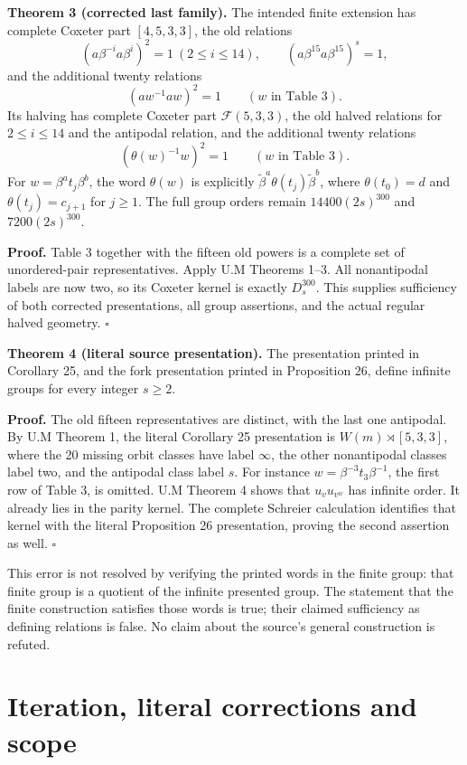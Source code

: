 \textbf{Theorem 3 (corrected last family).} The intended finite extension has complete Coxeter part \([4,5,3,3]\), the old relations
\[
 (a\beta^{-i}a\beta^i)^2=1\ (2\le i\le14),\qquad
 (a\beta^{15}a\beta^{15})^s=1,
\]
and the additional twenty relations
\[
 (a w^{-1}a w)^2=1\qquad(w\text{ in Table 3}). \tag{10}
\]
Its halving has complete Coxeter part \(\mathcal F(5,3,3)\), the old halved relations for \(2\le i\le14\) and the antipodal relation, and the additional twenty relations
\[
 (\theta(w)^{-1}w)^2=1\qquad(w\text{ in Table 3}). \tag{11}
\]
For \(w=\beta^a t_j\beta^b\), the word \(\theta(w)\) is explicitly \(\widetilde\beta^a\theta(t_j)\widetilde\beta^b\), where \(\theta(t_0)=d\) and \(\theta(t_j)=c_{j+1}\) for \(j\ge1\). The full group orders remain \(14400(2s)^{300}\) and \(7200(2s)^{300}\).

\textbf{Proof.} Table 3 together with the fifteen old powers is a complete set of unordered-pair representatives. Apply U.M Theorems 1--3. All nonantipodal labels are now two, so its Coxeter kernel is exactly \(D_s^{300}\). This supplies sufficiency of both corrected presentations, all group assertions, and the actual regular halved geometry. $\square$

\textbf{Theorem 4 (literal source presentation).} The presentation printed in Corollary 25, and the fork presentation printed in Proposition 26, define infinite groups for every integer \(s\ge2\).

\textbf{Proof.} The old fifteen representatives are distinct, with the last one antipodal. By U.M Theorem 1, the literal Corollary 25 presentation is \(W(m)\rtimes[5,3,3]\), where the 20 missing orbit classes have label \(\infty\), the other nonantipodal classes label two, and the antipodal class label \(s\). For instance \(w=\beta^{-3}t_3\beta^{-1}\), the first row of Table 3, is omitted. U.M Theorem 4 shows that \(u_vu_{v^w}\) has infinite order. It already lies in the parity kernel. The complete Schreier calculation identifies that kernel with the literal Proposition 26 presentation, proving the second assertion as well. $\square$

This error is not resolved by verifying the printed words in the finite group: that finite group is a quotient of the infinite presented group. The statement that the finite construction satisfies those words is true; their claimed sufficiency as defining relations is false. No claim about the source's general construction is refuted.

\section{Iteration, literal corrections and scope}\label{iteration-literal-corrections-and-scope}


